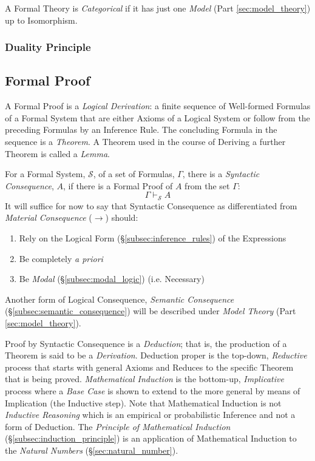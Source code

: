 \documentclass{article}
\begin{document}
A Formal Theory is \emph{Categorical} if it has just one \emph{Model}
(Part \ref{sec:model_theory}) up to Isomorphism.




\subsubsection{Duality Principle}\label{subsec:duality_principle}



\subsection{Formal Proof} \label{subsec:formal_proof}

A Formal Proof is a \emph{Logical Derivation}: a finite sequence of
Well-formed Formulas of a Formal System that are either Axioms of a
Logical System or follow from the preceding Formulas by an Inference
Rule. The concluding Formula in the sequence is a \emph{Theorem}. A
Theorem used in the course of Deriving a further Theorem is called a
\emph{Lemma}.

For a Formal System, $\mathcal{S}$, of a set of Formulas, $\Gamma$,
there is a \emph{Syntactic Consequence}, $A$, if there is a
Formal Proof of $A$ from the set $\Gamma$:
\[
    \Gamma \vdash_{\mathcal{S}} A
\]
It will suffice for now to say that Syntactic Consequence as
differentiated from \emph{Material Consequence} ($\rightarrow$)
should:

\begin{enumerate}
\item Rely on the Logical Form (\S\ref{subsec:inference_rules}) of the
  Expressions
\item Be completely \emph{a priori}
\item Be \emph{Modal} (\S\ref{subsec:modal_logic}) (i.e. Necessary)
\end{enumerate}
Another form of Logical Consequence, \emph{Semantic Consequence}
(\S\ref{subsec:semantic_consequence}) will be described under
\emph{Model Theory} (Part \ref{sec:model_theory}).

Proof by Syntactic Consequence is a \emph{Deduction}; that is, the
production of a Theorem is said to be a \emph{Derivation}. Deduction
proper is the top-down, \emph{Reductive} process that starts with
general Axioms and Reduces to the specific Theorem that is being
proved. \emph{Mathematical Induction} is the bottom-up,
\emph{Implicative} process where a \emph{Base Case} is shown to extend
to the more general by means of Implication (the Inductive step). Note
that Mathematical Induction is not \emph{Inductive Reasoning} which is
an empirical or probabilistic Inference and not a form of Deduction.
The \emph{Principle of Mathematical Induction}
(\S\ref{subsec:induction_principle}) is an application of Mathematical
Induction to the \emph{Natural Numbers}
(\S\ref{sec:natural_number}).
\end{document}
